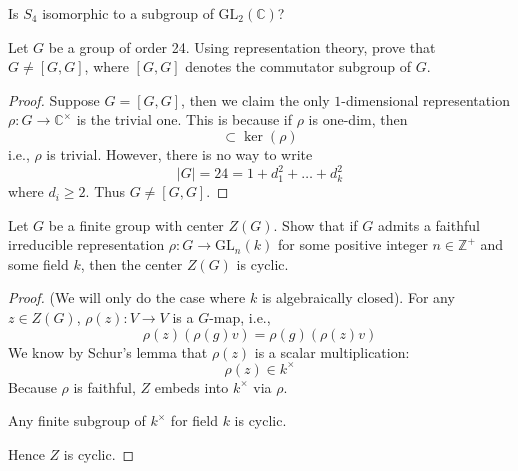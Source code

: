 \begin{prob}[S2018-Q4, S2007-Q5]
    Is $S_4$ isomorphic to a subgroup of $\text{GL}_2(\mathbb{C})$?
\end{prob}


\begin{prob}[S2010-Q6]
    Let \( G \) be a group of order 24. Using representation theory, prove that \( G \neq [G, G] \), where \([G, G]\) denotes the commutator subgroup of \( G \).
\end{prob}
\begin{proof}
    Suppose $G=[G,G]$, then we claim the only $1$-dimensional representation $\rho:G\to\mathbb{C}^\times$ is the trivial one. This is because if $\rho$ is one-dim, then
    \begin{equation*}
        [G,G]\subset\ker(\rho)
    \end{equation*}
    i.e., $\rho$ is trivial. However, there is no way to write 
    \begin{equation*}
        |G|=24=1+d_1^2+\dots+d_k^2
    \end{equation*}
    where $d_i\geq 2$. Thus $G\neq [G,G]$.
\end{proof}

\begin{prob}[F2017-Q6]
    Let \( G \) be a finite group with center \( Z(G) \). Show that if \( G \) admits a faithful irreducible representation \( \rho \colon G \to \mathrm{GL}_n(k) \) for some positive integer \( n \in \mathbb{Z}^+ \) and some field \( k \), then the center \( Z(G) \) is cyclic.
\end{prob}
\begin{proof}
    (We will only do the case where $k$ is algebraically closed). For any $z\in Z(G)$, $\rho(z): V\to V$ is a $G$-map, i.e., 
    \begin{equation*}
        \rho(z)(\rho(g)v)=\rho(g)(\rho(z)v)
    \end{equation*}
    We know by Schur's lemma that $\rho(z)$ is a scalar multiplication: 
    \begin{equation*}
        \rho(z)\in k^\times
    \end{equation*}
    Because $\rho$ is faithful, $Z$ embeds into $k^\times$ via $\rho$. 
    \begin{lem}[Fact]
        Any finite subgroup of $k^\times$ for field $k$ is cyclic.
    \end{lem}
    Hence $Z$ is cyclic.
\end{proof}


